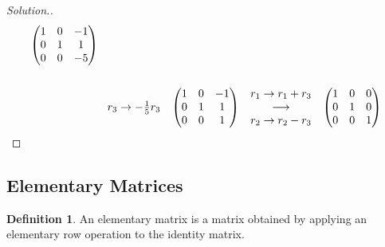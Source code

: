 \documentclass[11pt,a4paper]{article}
\theoremstyle{definition}
\newtheorem{defn}[thm]{Definition}
\newenvironment{solution}
  {\renewcommand{\qedsymbol}{}\begin{proof}[\textit{Solution}.]}
  {\end{proof}}
\begin{document}
\begin{solution}
\begin{align*}
\hspace{0.3cm}
\begin{pmatrix}
1&0&-1\\0&1&1\\0&0&-5\\
\end{pmatrix}\\\\
&\hspace{0.3cm}
\begin{matrix}
r_3\rightarrow -\frac{1}{5}r_3\\
\end{matrix}
\hspace{0.3cm}
\begin{pmatrix}
1&0&-1\\0&1&1\\0&0&1\\
\end{pmatrix}
\hspace{0.3cm}
\begin{matrix}
r_1\rightarrow r_1+r_3\\ \longrightarrow\\ r_2\rightarrow r_2-r_3\\
\end{matrix}
\hspace{0.3cm}
\begin{pmatrix}
1&0&0\\ 0&1&0\\0&0&1\\
\end{pmatrix}\\
\end{align*}


\pagebreak
\end{solution}


\subsection{Elementary Matrices}

\begin{defn}
An elementary matrix is a matrix obtained by applying an elementary row operation to the identity matrix.
\end{defn}
\end{document}
